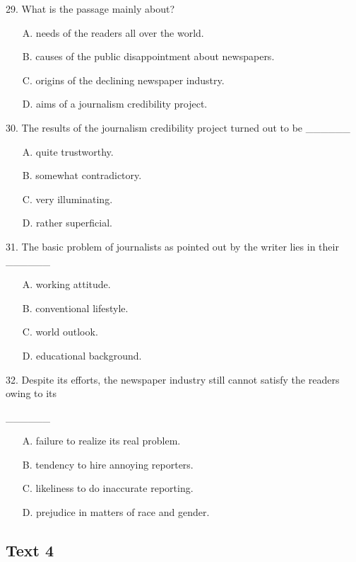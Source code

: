 \documentclass[UTF8,11pt]{ctexart}
\begin{document}
29. What is the passage mainly about?


\begin{itemize}[leftmargin=2em,itemsep=.2em,topsep=.4em]\item[A.] needs of the readers all over the world.
\item[B.] causes of the public disappointment about newspapers.
\item[C.] origins of the declining newspaper industry.
\item[D.] aims of a journalism credibility project.
\end{itemize}

30. The results of the journalism credibility project turned out to be \_\_\_\_\_\_


\begin{itemize}[leftmargin=2em,itemsep=.2em,topsep=.4em]\item[A.] quite trustworthy.
\item[B.] somewhat contradictory.
\item[C.] very illuminating.
\item[D.] rather superficial.
\end{itemize}

31. The basic problem of journalists as pointed out by the writer lies in their \_\_\_\_\_\_


\begin{itemize}[leftmargin=2em,itemsep=.2em,topsep=.4em]\item[A.] working attitude.
\item[B.] conventional lifestyle.
\item[C.] world outlook.
\item[D.] educational background.
\end{itemize}

32. Despite its efforts, the newspaper industry still cannot satisfy the readers owing to its


\_\_\_\_\_\_


\begin{itemize}[leftmargin=2em,itemsep=.2em,topsep=.4em]\item[A.] failure to realize its real problem.
\item[B.] tendency to hire annoying reporters.
\item[C.] likeliness to do inaccurate reporting.
\item[D.] prejudice in matters of race and gender.
\end{itemize}

\subsection*{\textbf{Text 4}}
\end{document}
